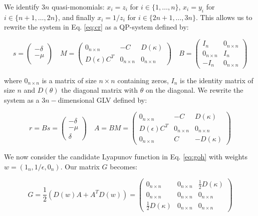 \documentclass{article}
\begin{document}
We identify \(3n\) quasi-monomials: \(x_i = z_i\) for
\(i \in \{1, \ldots, n\}\), \(x_i = y_i\) for
\(i \in \{n + 1, \ldots, 2 n\}\), and finally \(x_i = 1 / z_i\) for
\(i \in \{2 n + 1, \ldots, 3 n\}\). This allows us to rewrite the system
in Eq. \ref{eq:cr} as a QP-system defined by:

\begin{equation}
\label{eq:crqp}
s = \begin{pmatrix}
-\delta \\
-\mu \\
\end{pmatrix} \quad 
M = \begin{pmatrix}
0_{n \times n} & -C & D(\kappa)\\
D(\epsilon)C^T & 0_{n \times n} & 0_{n \times n}
\end{pmatrix} \quad
B = \begin{pmatrix}
I_n & 0_{n \times n}\\
0_{n \times n} & I_n\\
-I_n & 0_{n \times n}
\end{pmatrix}
\end{equation}

where \(0_{n \times n}\) is a matrix of size \(n \times n\) containing
zeros, \(I_n\) is the identity matrix of size \(n\) and \(D(\theta)\)
the diagonal matrix with \(\theta\) on the diagonal. We rewrite the
system as a \(3n-\)dimensional GLV defined by:

\begin{equation}
r = B s = \begin{pmatrix}
-\delta \\
-\mu \\
\delta
\end{pmatrix} \quad
A = B M = \begin{pmatrix}
0_{n \times n} & -C & D(\kappa)\\
D(\epsilon) C^T & 0_{n \times n} & 0_{n \times n}\\
0_{n \times n} & C & -D(\kappa)
\end{pmatrix}
\end{equation}

We now consider the candidate Lyapunov function in Eq. \ref{eq:goh} with
weights \(w = (1_n, 1 / \epsilon, 0_n)\). Our matrix \(G\) becomes:

\begin{equation}
G = \frac{1}{2}(D(w) A + A^T D(w)) = \begin{pmatrix}
0_{n \times n} & 0_{n \times n} & \frac{1}{2} D(\kappa)\\
0_{n \times n} & 0_{n \times n} & 0_{n \times n}\\
\frac{1}{2} D(\kappa) & 0_{n \times n} & 0_{n \times n}
\end{pmatrix}
\end{equation}
\end{document}
